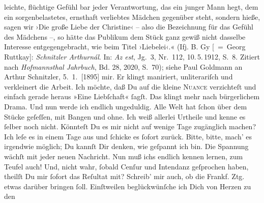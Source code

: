 \begin{ledgroupsized}[t]{13cm}
{{{                     leichte, flüchtige Gefühl bar jeder Verantwortung, das ein junger Mann hegt,
                     dem ein sorgenbelastetes, ernsthaft verliebtes Mädchen gegenüber steht, sondern
                     hieße, sagen wir ›Die große Liebe der Christine‹ – also die Bezeichnung für das
                     Gefühl des Mädchens –, so hätte das Publikum dem Stück ganz gewiß nicht
                     dasselbe Interesse entgegengebracht, wie beim Titel ›Liebelei‹.« (Ifj. B. Gy [ = Georg Ruttkay]: \emph{Schnitzler Arthurnál}. In: \emph{Az est}, Jg. 3, Nr. 112, 10. 5. 1912, S. 8. Zitiert nach \emph{Hofmannsthal Jahrbuch}, Bd. 28, 2020, S. 70);
                     siehe Paul Goldmann an Arthur Schnitzler, 5. 1. [1895]}}}\label{K_L02630-56h} mir. {\pb}Er klingt maniriert, unliterariſch und
               verkleinert die Arbeit. Ich möchte, daß Du auf die kleine \textsc{Nuance} verzichteſt und einfach gerade heraus »Eine Liebſchaft« ſagſt. Das
               klingt mehr nach bürgerlichem Drama. Und nun werde ich endlich ungeduldig. Alle Welt
               hat ſchon über dem Stücke
               geſeſſen, mit  Bangen und ohne. Ich weiß allerlei
               Urtheile und kenne es ſelber noch nicht. Könnteſt Du es mir nicht auf wenige Tage
               zugänglich machen? Ich leſe es in einem Tage aus und ſchicke es ſofort zurück. Bitte,
               bitte, mach’ es irgendwie möglich; Du kannſt Dir denken, wie geſpannt {\pb}ich bin. Die Spannung wächſt mit jeder neuen
               Nachricht. Nun muß ichs endlich kennen lernen, zum Teufel auch! Und, nicht wahr,
               ſobald Cenſur und Intendanz geſprochen haben, theilſt Du mir ſofort das Reſultat mit?
               Schreib’ mir auch, ob die Frankf. Ztg. etwas
               darüber bringen ſoll. Einſtweilen beglückwünſche ich Dich von Herzen zu den

\end{ledgroupsized}
